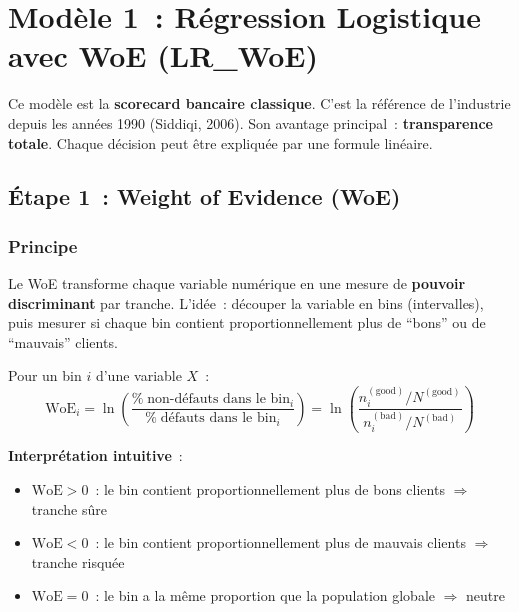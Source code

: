 \documentclass[12pt,a4paper]{article}
\begin{document}
\section{Mod\`ele 1~: R\'egression Logistique avec WoE (LR\_WoE)}
\label{sec:lr_woe}

Ce mod\`ele est la \textbf{scorecard bancaire classique}. C'est la r\'ef\'erence de l'industrie depuis les ann\'ees 1990 (Siddiqi, 2006). Son avantage principal~: \textbf{transparence totale}. Chaque d\'ecision peut \^etre expliqu\'ee par une formule lin\'eaire.

\subsection{\'Etape 1~: Weight of Evidence (WoE)}

\subsubsection{Principe}

Le WoE transforme chaque variable num\'erique en une mesure de \textbf{pouvoir discriminant} par tranche. L'id\'ee~: d\'ecouper la variable en bins (intervalles), puis mesurer si chaque bin contient proportionnellement plus de ``bons'' ou de ``mauvais'' clients.

\begin{definitionbox}
Pour un bin $i$ d'une variable $X$~:
\begin{equation}
    \text{WoE}_i = \ln\left(\frac{\%\;\text{non-d\'efauts dans le bin}_i}{\%\;\text{d\'efauts dans le bin}_i}\right)
    = \ln\left(\frac{n_{i}^{(\text{good})} / N^{(\text{good})}}{n_{i}^{(\text{bad})} / N^{(\text{bad})}}\right)
    \label{eq:woe}
\end{equation}
\end{definitionbox}

\textbf{Interpr\'etation intuitive}~:
\begin{itemize}[noitemsep]
    \item $\text{WoE} > 0$~: le bin contient proportionnellement plus de bons clients $\Rightarrow$ tranche s\^ure
    \item $\text{WoE} < 0$~: le bin contient proportionnellement plus de mauvais clients $\Rightarrow$ tranche risqu\'ee
    \item $\text{WoE} = 0$~: le bin a la m\^eme proportion que la population globale $\Rightarrow$ neutre
\end{itemize}
\end{document}
